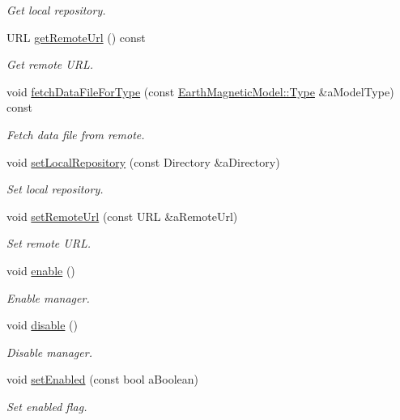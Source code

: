 \begin{DoxyCompactItemize}
\begin{DoxyCompactList}\small\item\em Get local repository. \end{DoxyCompactList}\item 
U\+RL \hyperlink{classlibrary_1_1physics_1_1environment_1_1magnetic_1_1earth_1_1_manager_ad5f056edd2595e364bfb7a17fb90997b}{get\+Remote\+Url} () const
\begin{DoxyCompactList}\small\item\em Get remote U\+RL. \end{DoxyCompactList}\item 
void \hyperlink{classlibrary_1_1physics_1_1environment_1_1magnetic_1_1earth_1_1_manager_ab7b2a60a81f8acda94ad977ba6db17d0}{fetch\+Data\+File\+For\+Type} (const \hyperlink{classlibrary_1_1physics_1_1environment_1_1magnetic_1_1_earth_ab9d257d23aa5899a3ef36c7dec62ef72}{Earth\+Magnetic\+Model\+::\+Type} \&a\+Model\+Type) const
\begin{DoxyCompactList}\small\item\em Fetch data file from remote. \end{DoxyCompactList}\item 
void \hyperlink{classlibrary_1_1physics_1_1environment_1_1magnetic_1_1earth_1_1_manager_a83e0891efe48d2a92639d7dd37f6b661}{set\+Local\+Repository} (const Directory \&a\+Directory)
\begin{DoxyCompactList}\small\item\em Set local repository. \end{DoxyCompactList}\item 
void \hyperlink{classlibrary_1_1physics_1_1environment_1_1magnetic_1_1earth_1_1_manager_a1c809eef5c24719dd852e63befdd6a64}{set\+Remote\+Url} (const U\+RL \&a\+Remote\+Url)
\begin{DoxyCompactList}\small\item\em Set remote U\+RL. \end{DoxyCompactList}\item 
void \hyperlink{classlibrary_1_1physics_1_1environment_1_1magnetic_1_1earth_1_1_manager_a30d2ab3d6b2c1d6fae3728ccfd9945bf}{enable} ()
\begin{DoxyCompactList}\small\item\em Enable manager. \end{DoxyCompactList}\item 
void \hyperlink{classlibrary_1_1physics_1_1environment_1_1magnetic_1_1earth_1_1_manager_a169f617d62727a12019624b712c416d7}{disable} ()
\begin{DoxyCompactList}\small\item\em Disable manager. \end{DoxyCompactList}\item 
void \hyperlink{classlibrary_1_1physics_1_1environment_1_1magnetic_1_1earth_1_1_manager_a5b2fea6c64af1c55ab776ae722ea4866}{set\+Enabled} (const bool a\+Boolean)
\begin{DoxyCompactList}\small\item\em Set enabled flag. \end{DoxyCompactList}\end{DoxyCompactItemize}
